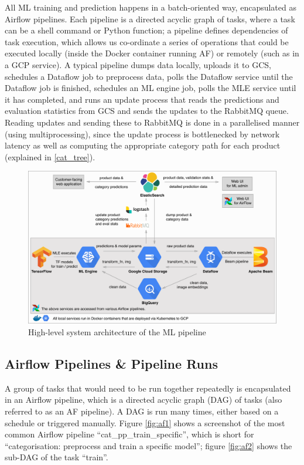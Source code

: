 All ML training and prediction happens in a batch-oriented way, encapsulated as Airflow pipelines.
Each pipeline is a directed acyclic graph of tasks, where a task can be a shell command or Python function; a pipeline defines dependencies of task execution, which allows us co-ordinate a series of operations that could be executed locally (inside the Docker container running AF) or remotely (such as in a GCP service).
A typical pipeline dumps data locally, uploads it to GCS, schedules a Dataflow job to preprocess data, polls the Dataflow service until the Dataflow job is finished, schedules an ML engine job, polls the MLE service until it has completed, and runs an update process that reads the predictions and evaluation statistics from GCS and sends the updates to the RabbitMQ queue.
Reading updates and sending these to RabbitMQ is done in a parallelised manner (using multiprocessing), since the update process is bottlenecked by network latency as well as computing the appropriate category path for each product (explained in \ref{cat_tree}).

\begin{figure}
  \hspace*{-0.2\textwidth}
  \includegraphics[width=1.4\textwidth]{diagrams/architecture}
  \caption{High-level system architecture of the ML pipeline}
  \label{arch_diagram}
\end{figure}

\subsection{Airflow Pipelines \& Pipeline Runs}

A group of tasks that would need to be run together repeatedly is encapsulated in an Airflow pipeline, which is a directed acyclic graph (DAG) of tasks (also referred to as an AF pipeline).
A DAG is run many times, either based on a schedule or triggered manually.
Figure \ref{fig:af1} shows a screenshot of the most common Airflow pipeline ``cat\_pp\_train\_specific'', which is short for ``categorisation: preprocess and train a specific model''; figure \ref{fig:af2} shows the sub-DAG of the task ``train''.

